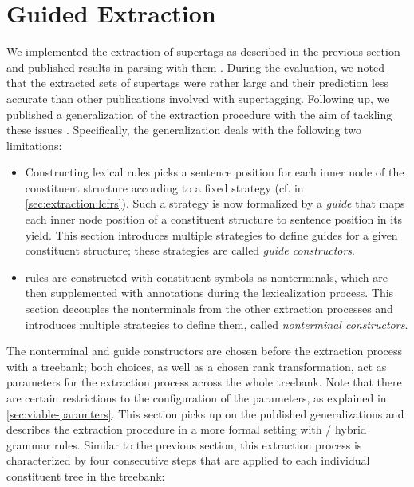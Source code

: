 \documentclass[../../document.tex]{subfiles}
\begin{document}
    \section{Guided Extraction} \label{sec:extraction:guided}
    We implemented the extraction of  supertags as described in the previous section and published results in parsing with them \citep{RupMoe21}.
    During the evaluation, we noted that the extracted sets of supertags were rather large and their prediction less accurate than other publications involved with supertagging.
    Following up, we published a generalization of the extraction procedure with the aim of tackling these issues \citep{Rup22}.
    Specifically, the generalization deals with the following two limitations:
    \begin{itemize}
        \item
            Constructing lexical  rules picks a sentence position for each inner node of the constituent structure according to a fixed strategy (cf.\@ {} in \cref{sec:extraction:lcfrs}).
            Such a strategy is now formalized by a \emph{guide} that maps each inner node position of a constituent structure to sentence position in its yield.
            This section introduces multiple strategies to define guides for a given constituent structure; these strategies are called \emph{guide constructors}.
        \item
             rules are constructed with constituent symbols as nonterminals, which are then supplemented with annotations during the lexicalization process.
            This section decouples the nonterminals from the other extraction processes and introduces multiple strategies to define them, called \emph{nonterminal constructors}.
    \end{itemize}
    The nonterminal and guide constructors are chosen before the extraction process with a treebank; both choices, as well as a chosen rank transformation, act as parameters for the extraction process across the whole treebank.
    Note that there are certain restrictions to the configuration of the parameters, as explained in \cref{sec:viable-paramters}.
    This section picks up on the published generalizations and describes the extraction procedure in a more formal setting with / hybrid grammar rules.
    Similar to the previous section, this extraction process is characterized by four consecutive steps that are applied to each individual constituent tree in the treebank:
\end{document}
